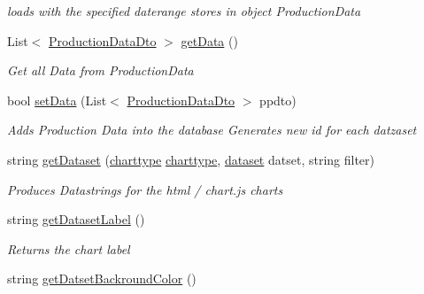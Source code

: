 \begin{DoxyCompactItemize}
\begin{DoxyCompactList}\small\item\em loads with the specified daterange stores in object {\ttfamily  Production\+Data } \end{DoxyCompactList}\item 
List$<$ \hyperlink{classkpi_mvc_api_1_1_data_transfer_objects_1_1_production_data_dto}{Production\+Data\+Dto} $>$ \hyperlink{classkpi_mvc_api_1_1_data_transfer_objects_1_1_production_data_dto_rs_abd52b81c37bd026514f480e3d6dd952b}{get\+Data} ()
\begin{DoxyCompactList}\small\item\em Get all Data from {\ttfamily Production\+Data} \end{DoxyCompactList}\item 
bool \hyperlink{classkpi_mvc_api_1_1_data_transfer_objects_1_1_production_data_dto_rs_a403a889d4d7b6dbc5ddd07e85c660892}{set\+Data} (List$<$ \hyperlink{classkpi_mvc_api_1_1_data_transfer_objects_1_1_production_data_dto}{Production\+Data\+Dto} $>$ ppdto)
\begin{DoxyCompactList}\small\item\em Adds Production Data into the database Generates new id for each datzaset \end{DoxyCompactList}\item 
string \hyperlink{classkpi_mvc_api_1_1_data_transfer_objects_1_1_production_data_dto_rs_adc1e1fa71f2425f2eff2ac5a563f4d7c}{get\+Dataset} (\hyperlink{classkpi_mvc_api_1_1_data_transfer_objects_1_1_production_data_dto_rs_a45716f0cdee396710530b9562be56f9a}{charttype} \hyperlink{classkpi_mvc_api_1_1_data_transfer_objects_1_1_production_data_dto_rs_a45716f0cdee396710530b9562be56f9a}{charttype}, \hyperlink{classkpi_mvc_api_1_1_data_transfer_objects_1_1_production_data_dto_rs_ab356c7600182705746e7b61967dd63df}{dataset} datset, string filter)
\begin{DoxyCompactList}\small\item\em Produces Datastrings for the html / chart.\+js charts \end{DoxyCompactList}\item 
string \hyperlink{classkpi_mvc_api_1_1_data_transfer_objects_1_1_production_data_dto_rs_a00fbb03b6dab63ddc0076349fcf419b3}{get\+Dataset\+Label} ()
\begin{DoxyCompactList}\small\item\em Returns the chart label \end{DoxyCompactList}\item 
string \hyperlink{classkpi_mvc_api_1_1_data_transfer_objects_1_1_production_data_dto_rs_a6bf08aafc72411a608bd747f86a7fab9}{get\+Datset\+Backround\+Color} ()

\end{DoxyCompactItemize}
